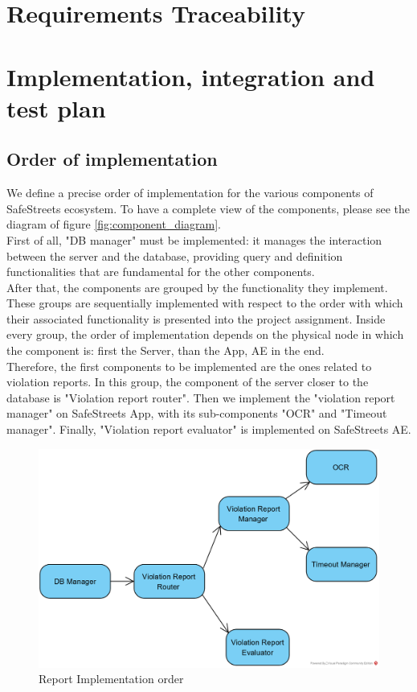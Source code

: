 \documentclass{article}
\begin{document}
	\clearpage	
	\section{Requirements Traceability}
	
	\clearpage	
	\section{Implementation, integration and test plan}

		\subsection{Order of implementation}
		We define a precise order of implementation for the various components of SafeStreets ecosystem. To have a complete view of the components, please see the diagram of figure \ref{fig:component_diagram}.\\
		First of all, "DB manager" must be implemented: it manages the interaction between the server and the database, providing query and definition functionalities that are fundamental for the other components.\\
		After that, the components are grouped by the functionality they implement. These groups are sequentially implemented with respect to the order with which their associated functionality is presented into the project assignment. Inside every group, the order of implementation depends on the physical node in which the component is: first the Server, than the App, AE in the end.\\
		Therefore, the first components to be implemented are the ones related to violation reports. In this group, the component of the server closer to the database is "Violation report router". Then we implement the "violation report manager" on SafeStreets App, with its sub-components "OCR" and "Timeout manager". Finally, "Violation report evaluator" is implemented on SafeStreets AE.\\
		\begin{figure}[H]
			\includegraphics [scale=0.9] {diagrams/report_impltest.png}
			\caption[Report Implementation order]{Report Implementation order}
			\label{fig:report_order}
		\end{figure}
\end{document}
